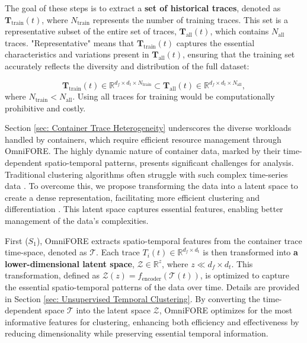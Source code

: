 The goal of these steps is to extract a \textbf{set of historical traces}, denoted as \(\mathbf{T}_{\text{train}}(t)\), where \(N_{\text{train}}\) represents the number of training traces. This set is a representative subset of the entire set of traces, \(\mathbf{T}_{\text{all}}(t)\), which contains \(N_{\text{all}}\) traces. "Representative" means that \(\mathbf{T}_{\text{train}}(t)\) captures the essential characteristics and variations present in \(\mathbf{T}_{\text{all}}(t)\), ensuring that the training set accurately reflects the diversity and distribution of the full dataset:

\begin{equation}
\mathbf{T}_{\text{train}}(t) \in \mathbb{R}^{d_f \times d_t \times N_{\text{train}}} \subset \mathbf{T}_{\text{all}}(t) \in \mathbb{R}^{d_f \times d_t \times N_{\text{all}}},
\end{equation}
where $N_{\text{train}} < N_{\text{all}}$. Using all traces for training would be computationally prohibitive and costly.

Section \ref{sec: Container Trace Heterogeneity} underscores the diverse workloads handled by containers, which require efficient resource management through OmniFORE. The highly dynamic nature of container data, marked by their time-dependent spatio-temporal patterns, presents significant challenges for analysis. Traditional clustering algorithms often struggle with such complex time-series data \cite{gupta2020approaches}. To overcome this, we propose transforming the data into a latent space to create a dense representation, facilitating more efficient clustering and differentiation \cite{frazier2018tutorial}. This latent space captures essential features, enabling better management of the data's complexities.

First ($S_1$), OmniFORE extracts spatio-temporal features from the container trace time-space, denoted as $\mathcal{T}$. Each trace $T_i(t) \in \mathbb{R}^{d_f \times d_{\text{t}}}$ is then transformed into \textbf{a lower-dimensional latent space}, $\mathcal{Z} \in \mathbb{R}^{z}$, where $z \ll d_f \times d_t$. This transformation, defined as $\mathcal{Z}(z) = f_{\text{encoder}}(\mathcal{T}(t))$, is optimized to capture the essential spatio-temporal patterns of the data over time. Details are provided in Section \ref{sec: Unsupervised Temporal Clustering}. By converting the time-dependent space $\mathcal{T}$ into the latent space $\mathcal{Z}$, OmniFORE optimizes for the most informative features for clustering, enhancing both efficiency and effectiveness by reducing dimensionality while preserving essential temporal information.

